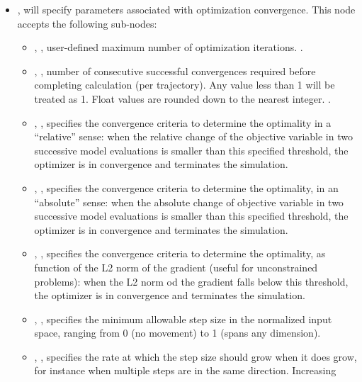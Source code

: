 \begin{itemize}
\item {},  will specify parameters associated with optimization
convergence. This node accepts the following sub-nodes:
  \begin{itemize}
  \item {}, , user-defined maximum number of optimization iterations. .
  \item {}, , number of consecutive successful
    convergences required before completing calculation (per trajectory). Any value less than 1 will be
    treated as 1.  Float values are rounded down to the nearest integer. .
  \item {}, , specifies the convergence criteria to determine the optimality
  in a ``relative'' sense: when the relative change of the objective variable in two successive model evaluations is smaller than
  this specified threshold, the  optimizer is in convergence and terminates the simulation.
  \item {}, , specifies the convergence criteria to determine the optimality,
  in an ``absolute'' sense: when the absolute change of objective variable in two successive model evaluations is smaller
  than this specified threshold, the  optimizer is in convergence and terminates the simulation.
  \item {}, , specifies the convergence criteria to determine the optimality,
   as function of the L2 norm of the gradient (useful for unconstrained problems): when the L2 norm od the gradient falls below this threshold, the  optimizer is in convergence and terminates the simulation.
  \item {}, , specifies the minimum allowable step size in
    the normalized input space, ranging from 0 (no movement) to 1 (spans any dimension).
  \item {}, , specifies the rate at which the step size
    should grow when it does grow, for instance when multiple steps are in the same direction.  Increasing

\end{itemize}
\end{itemize}
